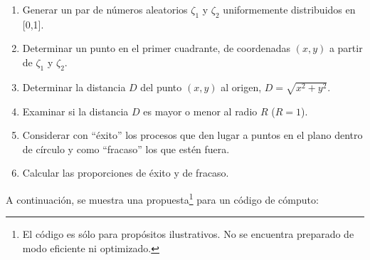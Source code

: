 \begin{enumerate}
 \item Generar un par de n\'umeros aleatorios $\zeta_{1}$ y $\zeta_{2}$ uniformemente distribuidos en [0,1].\\

 \item Determinar un punto en el primer cuadrante, de coordenadas $(x, y)$ a partir de $\zeta_{1}$ y $\zeta_{2}$. \\

 \item Determinar la distancia $D$ del punto $(x, y)$ al origen, $D = \sqrt{x^{2} + y^{2}}$. \\

 \item Examinar si la distancia $D$ es mayor o menor al radio $R$ ($R = 1$). \\

 \item Considerar con ``\'exito'' los procesos que den lugar a puntos en el plano dentro de c\'irculo y como ``fracaso'' los que est\'en
 fuera. \\

 \item Calcular las proporciones de \'exito y de fracaso. \\

\end{enumerate}

A continuaci\'on, se muestra una propuesta\footnote{El c\'odigo es s\'olo para prop\'ositos ilustrativos. No se encuentra preparado de modo
eficiente ni optimizado.} para un c\'odigo de c\'omputo:


